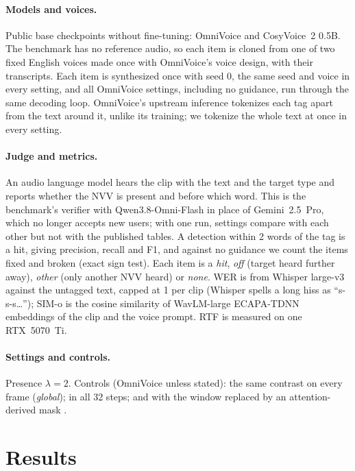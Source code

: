\documentclass[11pt]{article}
\begin{document}
\paragraph{Models and voices.} Public base checkpoints without fine-tuning: OmniVoice and CosyVoice~2 0.5B. The benchmark has no reference audio, so each item is cloned from one of two fixed English voices made once with OmniVoice's voice design, with their transcripts. Each item is synthesized once with seed 0, the same seed and voice in every setting, and all OmniVoice settings, including no guidance, run through the same decoding loop. OmniVoice's upstream inference tokenizes each tag apart from the text around it, unlike its training; we tokenize the whole text at once in every setting.

\paragraph{Judge and metrics.} An audio language model hears the clip with the text and the target type and reports whether the NVV is present and before which word. This is the benchmark's verifier with Qwen3.8-Omni-Flash \citep{qwen2025omni} in place of Gemini~2.5~Pro, which no longer accepts new users; with one run, settings compare with each other but not with the published tables. A detection within 2 words of the tag is a hit, giving precision, recall and F1, and against no guidance we count the items fixed and broken (exact sign test). Each item is a \emph{hit}, \emph{off} (target heard further away), \emph{other} (only another NVV heard) or \emph{none}. WER is from Whisper large-v3 \citep{radford2023whisper} against the untagged text, capped at 1 per clip (Whisper spells a long hiss as ``s-s-s\ldots''); SIM-o is the cosine similarity of WavLM-large \citep{chen2022wavlm} ECAPA-TDNN \citep{desplanques2020ecapa} embeddings of the clip and the voice prompt. RTF is measured on one RTX~5070~Ti.

\paragraph{Settings and controls.} Presence $\lambda = 2$. Controls (OmniVoice unless stated): the same contrast on every frame (\emph{global}); in all 32 steps; and with the window replaced by an attention-derived mask \citep{lee2026plcg}.

\section{Results}
\label{sec:results}
\end{document}
